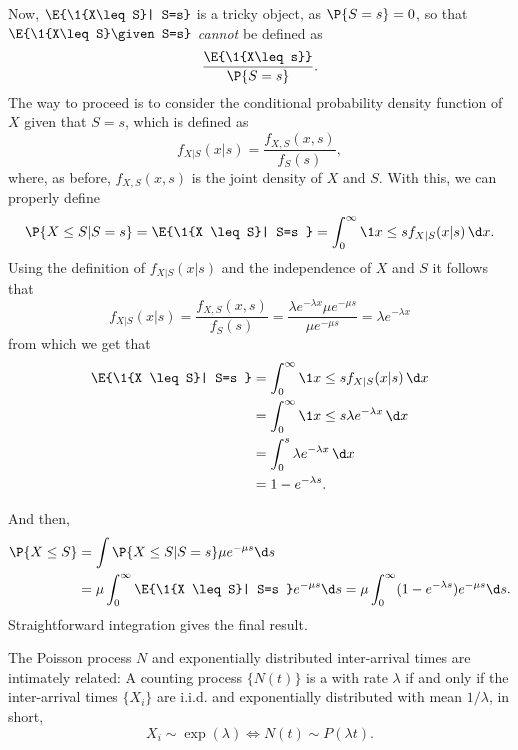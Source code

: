 \begin{exercise}
\begin{solution}
Now, $\E{\1{X\leq S}| S=s}$ is a tricky object, as $\P{S=s} = 0$, so that 
$\E{\1{X\leq S}\given S=s}$ \emph{cannot} be defined as 
\begin{equation*}
\frac{\E{\1{X\leq s}}}{\P{S=s}}.
\end{equation*}
The way to proceed is to consider the conditional probability density function of $X$ given that $S=s$, which is defined as
\begin{equation*}
  f_{X|S}(x|s) = \frac{f_{X, S}( x, s)}{f_S(s)},
\end{equation*}
where, as before, $f_{X, S}( x, s)$ is the joint density of $X$ and $S$. With this, we can properly define
\begin{equation*}
  \begin{split}
  \P{X\leq S| S=s } = \E{\1{X \leq S}| S=s } = \int_0^\infty \1{x \leq s}   f_{X|S}(x|s)\, \d x.
  \end{split}
\end{equation*}
Using the definition of $f_{X|S}(x|s)$ and the independence of $X$ and $S$ it follows that
\begin{equation*}
  f_{X|S}(x|s) = \frac{f_{X, S}( x, s)}{f_S(s)} = \frac{\lambda e^{-\lambda x} \mu e^{-\mu s}}{\mu e^{-\mu s}} = \lambda e^{-\lambda x}
\end{equation*}
from which we get that 
\begin{align*}
  \E{\1{X \leq S}| S=s } 
&= \int_0^\infty \1{x \leq s}   f_{X|S}(x|s)\, \d x \\
&= \int_0^\infty \1{x \leq s} \lambda e^{-\lambda x}\, \d x \\
&= \int_0^s \lambda e^{-\lambda x}\, \d x \\
&= 1 - e^{-\lambda s}.
\end{align*}

And then,  
\begin{equation*}
  \begin{split}
  \P{X\leq S} &= \int \P{X\leq S| S=s} \mu e^{-\mu s}\d s \\
&= \mu \int_0^\infty \E{\1{X \leq S}| S=s } e^{-\mu s} \d s= \mu \int_0^\infty (1 - e^{-\lambda s})e^{-\mu s} \d s.
  \end{split}
\end{equation*}
Straightforward integration gives the final result.
\end{solution}
\end{exercise}



The Poisson process $N$ and exponentially distributed inter-arrival times are intimately related: A counting process $\{N(t)\}$ is a  with rate $\lambda$ if and only if  the inter-arrival times $\{X_i\}$ are i.i.d. and exponentially distributed with mean $1/\lambda$,  in short, 
\begin{equation*}
X_i\sim \exp(\lambda) \Leftrightarrow N(t) \sim P(\lambda t).
\end{equation*}


